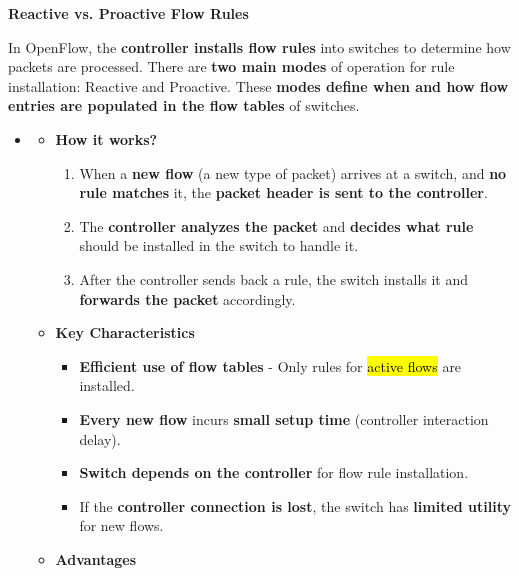 \highspace
\begin{flushleft}
    \textcolor{Green3}{ \textbf{Reactive vs. Proactive Flow Rules}}
\end{flushleft}
In OpenFlow, the \textbf{controller installs flow rules} into switches to determine how packets are processed. There are \textbf{two main modes} of operation for rule installation: Reactive and Proactive. These \textbf{modes define when and how flow entries are populated in the flow tables} of switches.
\begin{itemize}
    \item {}
    \begin{itemize}
        \item[\textcolor{Green3}{\faIcon{question-circle}}] \textcolor{Green3}{\textbf{How it works?}}
        \begin{enumerate}
            \item When a \textbf{new flow} (a new type of packet) arrives at a switch, and \textbf{no rule matches} it, the \textbf{packet header is sent to the controller}.
            \item The \textbf{controller analyzes the packet} and \textbf{decides what rule} should be installed in the switch to handle it.
            \item After the controller sends back a rule, the switch installs it and \textbf{forwards the packet} accordingly.
        \end{enumerate}
        \item[\textcolor{Green3}{\faIcon{list-ul}}] \textcolor{Green3}{\textbf{Key Characteristics}}
        \begin{itemize}
            \item \textbf{Efficient use of flow tables} - Only rules for \hl{active flows} are installed.
            \item \textbf{Every new flow} incurs \textbf{small setup time} (controller interaction delay).
            \item \textbf{Switch depends on the controller} for flow rule installation.
            \item If the \textbf{controller connection is lost}, the switch has \textbf{limited utility} for new flows.
        \end{itemize}
        \item[\textcolor{Green3}{\faIcon{check-circle}}] \textcolor{Green3}{\textbf{Advantages}}
        \begin{itemize}[label=\textcolor{Green3}{}]

\end{itemize}
\end{itemize}
\end{itemize}

